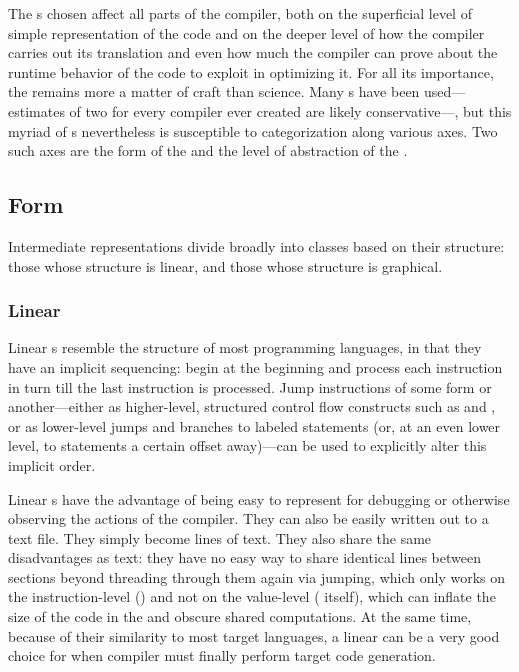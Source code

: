 The s chosen affect all parts of the compiler, both on the superficial level of simple representation of the code and on the deeper level of how the compiler carries out its translation and even how much the compiler can prove about the runtime behavior of the code to exploit in optimizing it. For all its importance, the  remains more a matter of craft than science. Many s have been used---estimates of two for every compiler ever created are likely conservative---, but this myriad of s nevertheless is susceptible to categorization along various axes. Two such axes are the form of the  and the level of abstraction of the .

\subsection{Form}
Intermediate representations divide broadly into classes based on their structure: those whose structure is linear, and those whose structure is graphical.

\subsubsection{Linear}
Linear s resemble the structure of most programming languages, in that they have an implicit sequencing: begin at the beginning and process each instruction in turn till the last instruction is processed. Jump instructions of some form or another---either as higher-level, structured control flow constructs such as  and , or as lower-level jumps and branches to labeled statements (or, at an even lower level, to statements a certain offset away)---can be used to explicitly alter this implicit order.

Linear s have the advantage of being easy to represent for debugging or otherwise observing the actions of the compiler. They can also be easily written out to a text file. They simply become lines of text. They also share the same disadvantages as text: they have no easy way to share identical lines between sections beyond threading through them again via jumping, which only works on the instruction-level () and not on the value-level ( itself), which can inflate the size of the code in the  and obscure shared computations. At the same time, because of their similarity to most target languages, a linear  can be a very good choice for when compiler must finally perform target code generation.

